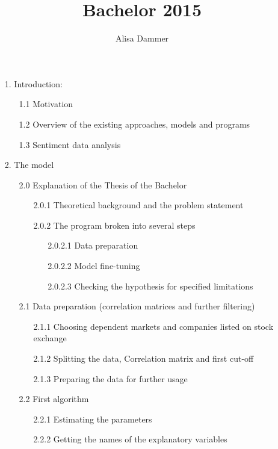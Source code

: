 \documentclass[12pt, a4paper]{article}
\title{Bachelor 2015}
\author{Alisa Dammer}
\begin{document}
\maketitle
 
\begin{enumerate}
	\item[1.] Introduction:
		\begin{enumerate}
			\item[1.1] Motivation
			\item[1.2] Overview of the existing approaches, models and programs
			\item[1.3] Sentiment data analysis
		\end{enumerate}
	\item[2.] The model
		\begin{enumerate}
			\item[2.0] Explanation of the Thesis of the Bachelor
				\begin{enumerate}
					\item[2.0.1] Theoretical background and the problem statement
					\item[2.0.2] The program broken into several steps
						\begin{enumerate}
							\item[2.0.2.1] Data preparation
							\item[2.0.2.2] Model fine-tuning
							\item[2.0.2.3] Checking the hypothesis for specified limitations
						\end{enumerate}
				\end{enumerate} 
			\item[2.1] Data preparation (correlation matrices and further filtering)	
				\begin{enumerate}
					\item[2.1.1] Choosing dependent markets and companies listed on stock exchange
					\item[2.1.2] Splitting the data, Correlation matrix and first cut-off
					\item[2.1.3] Preparing the data for further usage
				\end{enumerate}
			\item[2.2] First algorithm
				\begin{enumerate}
					\item[2.2.1] Estimating the parameters
					\item[2.2.2] Getting the names of the explanatory variables
				\end{enumerate}

\end{enumerate}
\end{enumerate}
\end{document}
